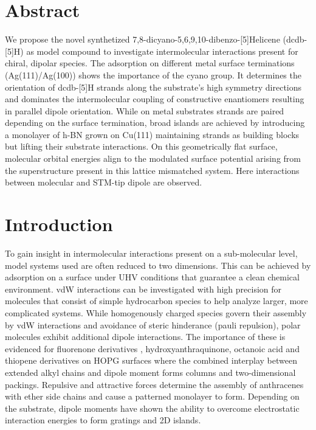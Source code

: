 \label{section:helicene}
\section{Abstract}

We propose the novel synthetized 7,8-dicyano-5,6,9,10-dibenzo-[5]Helicene (dcdb-[5]H) as model compound to investigate intermolecular interactions present for chiral, dipolar species. The adsorption on different metal surface terminations (Ag(111)/Ag(100)) shows the importance of the cyano group. It determines the orientation of dcdb-[5]H strands along the substrate's high symmetry directions and dominates the intermolecular coupling of constructive enantiomers resulting in parallel dipole orientation. While on metal substrates strands are paired depending on the surface termination, broad islands are achieved by introducing a monolayer of h-BN grown on Cu(111) maintaining strands as building blocks but lifting their substrate interactions. On this geometrically flat surface, molecular orbital energies align to the modulated surface potential arising from the superstructure present in this lattice mismatched system. Here interactions between molecular and STM-tip dipole are observed.

\section{Introduction}

To gain insight in intermolecular interactions present on a sub-molecular level, model systems used are often reduced to two dimensions. This can be achieved by adsorption on a surface under UHV conditions that guarantee a clean chemical environment. vdW interactions can be investigated with high precision for molecules that consist of simple hydrocarbon species to help analyze larger, more complicated systems. 
While homogenously charged species govern their assembly by vdW interactions and avoidance of steric hinderance (pauli repulsion), polar molecules exhibit additional dipole interactions. The importance of these is evidenced for fluorenone derivatives \cite{Cui_Self-assembly_2015, Xu_Dipole-controlled_2013, Xu_Two-dimensional_2012}, hydroxyanthraquinone\cite{Hu_Structural_2016}, octanoic acid \cite{Hu_Effects_2017} and thiopene derivatives \cite{Heller_Self-assemlby_2012} on HOPG surfaces where the combined interplay between extended alkyl chains and dipole moment forms columns and two-dimensional packings. Repulsive and attractive forces determine the assembly of anthracenes with ether side chains and cause a patterned monolayer to form\cite{Wei_Dipolar-control_2006}.  Depending on the substrate, dipole moments have shown the ability to overcome electrostatic interaction energies to form gratings and 2D islands.\cite{Kunkel_Self-assembly_2015}

